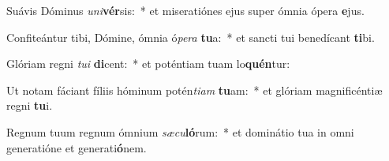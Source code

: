 \item Suávis Dóminus \textit{u}\textit{ni}\textbf{vér}sis:~* et miseratiónes ejus super ómnia ópera \textbf{e}jus.
\item Confiteántur tibi, Dómine, ómnia ó\textit{pe}\textit{ra} \textbf{tu}a:~* et sancti tui benedícant \textbf{ti}bi.
\item Glóriam regni \textit{tu}\textit{i} \textbf{di}cent:~* et poténtiam tuam lo\textbf{quén}tur:
\item Ut notam fáciant fíliis hóminum potén\textit{ti}\textit{am} \textbf{tu}am:~* et glóriam magnificéntiæ regni \textbf{tu}i.
\item Regnum tuum regnum ómnium \textit{sæ}\textit{cu}\textbf{ló}rum:~* et dominátio tua in omni generatióne et generati\textbf{ó}nem.
